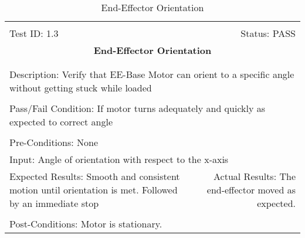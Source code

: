 \documentclass[titlepage]{article}
\begin{document}
\begin{center}
\begin{table}[h!]
\begin{tabular}{|l r|}\hline&\\[-2mm]
	Test ID: 1.3	&Status: PASS\\[-3mm]
	\multicolumn{2}{|c|}{\textbf{\large{End-Effector Orientation}}}\\&\\\hline&\\[-3mm]
	\multicolumn{2}{|p{\textwidth}|}{Description: Verify that EE-Base Motor can orient to a specific angle without getting stuck while loaded}\\[1mm]\hline&\\[-3mm]
	\multicolumn{2}{|p{\textwidth}|}{Pass/Fail Condition: If motor turns adequately and quickly as expected to correct angle}\\[1mm]\hline&\\[-3mm]
	\multicolumn{2}{|p{\textwidth}|}{Pre-Conditions: None}\\[4mm]
	\multicolumn{2}{|p{\textwidth}|}{Input: Angle of orientation with respect to the x-axis}\\[2mm]\hline
	\multicolumn{1}{|p{0.49\textwidth}}{Expected Results: Smooth and consistent motion until orientation is met. Followed by an immediate stop}	&\multicolumn{1}{|p{0.45\textwidth}|}{Actual Results: The end-effector moved as expected.}\\\hline&\\[-3mm]
	\multicolumn{2}{|p{\textwidth}|}{Post-Conditions: Motor is stationary.}\\\hline
\end{tabular}
\caption{End-Effector Orientation}
\end{table}
\end{center}
\newpage
\end{document}
